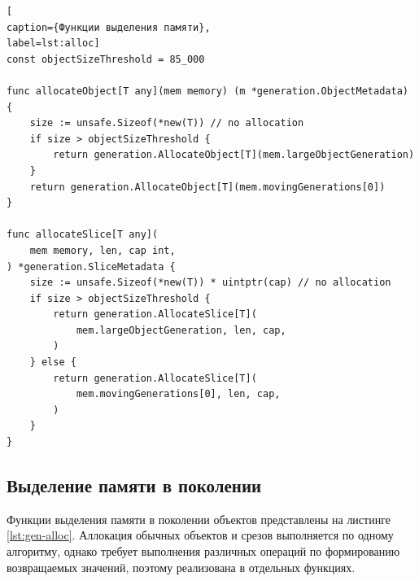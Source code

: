 \begin{lstlisting}[
caption={Функции выделения памяти},
label=lst:alloc]
const objectSizeThreshold = 85_000

func allocateObject[T any](mem memory) (m *generation.ObjectMetadata) {
	size := unsafe.Sizeof(*new(T)) // no allocation
	if size > objectSizeThreshold {
		return generation.AllocateObject[T](mem.largeObjectGeneration)
	}
	return generation.AllocateObject[T](mem.movingGenerations[0])
}

func allocateSlice[T any](
	mem memory, len, cap int,
) *generation.SliceMetadata {
	size := unsafe.Sizeof(*new(T)) * uintptr(cap) // no allocation
	if size > objectSizeThreshold {
		return generation.AllocateSlice[T](
			mem.largeObjectGeneration, len, cap,
		)
	} else {
		return generation.AllocateSlice[T](
			mem.movingGenerations[0], len, cap,
		)
	}
}
\end{lstlisting}



\subsection{Выделение памяти в поколении}

Функции выделения памяти в поколении объектов представлены на листинге \ref{lst:gen-alloc}. Аллокация обычных объектов и срезов выполняется по одному алгоритму, однако требует выполнения различных операций по формированию возвращаемых значений, поэтому реализована в отдельных функциях.


